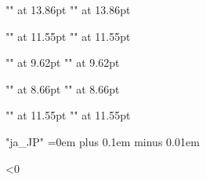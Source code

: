 {      %
      \font\chapmczzz"\txijamcfont" at 13.86pt
      \font\chapgtzzz"\txijagtfont" at 13.86pt
      \def\chapmc{\setjafont\chapmczzz}
      \def\chapgt{\setjafont\chapgtzzz}

      \font\secmczzz"\txijamcfont" at 11.55pt
      \font\secgtzzz"\txijagtfont" at 11.55pt
      \def\secmc{\setjafont\secmczzz}
      \def\secgt{\setjafont\secgtzzz}

      \font\ssecmczzz"\txijamcfont" at 9.62pt
      \font\ssecgtzzz"\txijagtfont" at 9.62pt
      \def\ssecmc{\setjafont\ssecmczzz}
      \def\ssecgt{\setjafont\ssecgtzzz}

      \font\reducedmczzz"\txijamcfont" at 8.66pt
      \font\reducedgtzzz"\txijagtfont" at 8.66pt
      \def\reducedmc{\setjafont\reducedmczzz}
      \def\reducedgt{\setjafont\reducedgtzzz}

      \font\shortcontmczzz"\txijamcfont" at 11.55pt
      \font\shortcontgtzzz"\txijagtfont" at 11.55pt
      \def\shortcontmc{\setjafont\shortcontmczzz}
      \def\shortcontgt{\setjafont\shortcontgtzzz}

    }

    \XeTeXlinebreaklocale "ja_JP"
    \XeTeXlinebreakskip=0em plus 0.1em minus 0.01em

    \ifx\XeTeXgenerateactualtext\thisisundefined
    \else
      \ifnum{}<0
      \fi
    \fi

  \fi %

  \iftxinativeunicodecapable


    \let\alphabeticrm\rm
    \gdef\rm{\alphabeticrm\tenmc}

    \let\alphabeticit\it
    \gdef\it{\alphabeticit\tenmc}

    \let\alphabeticsl\sl
    \gdef\sl{\alphabeticsl\tengt}

    \let\alphabeticbf\bf
    \gdef\bf{\alphabeticbf\tengt}

    \let\alphabetictt\tt
    \gdef\tt{\alphabetictt\tengt}


